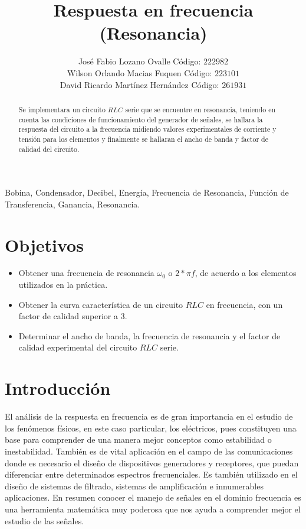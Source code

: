 \documentclass[twocolumn]{IEEEtran}
\begin{document}
\title{Respuesta en frecuencia (Resonancia)}
\author{José Fabio Lozano Ovalle Código: $222982$\\
	Wilson Orlando Macias Fuquen Código: $223101$\\
	David Ricardo Martínez Hernández Código: $261931$}
\maketitle
{}

\begin{abstract}
Se implementara un circuito $RLC$ serie que se encuentre en resonancia, teniendo en cuenta las condiciones de funcionamiento del generador de señales, se hallara la respuesta del circuito a la frecuencia midiendo valores experimentales de corriente y tensión para los elementos y finalmente se hallaran el ancho de banda y factor de calidad del circuito.
\end{abstract}

\begin{keywords}
Bobina, Condensador, Decibel, Energía, Frecuencia de Resonancia, Función de Transferencia, Ganancia, Resonancia.
\end{keywords}

\section{Objetivos}
\begin{itemize}
 \item Obtener una frecuencia de resonancia $\omega _0$ o $2*\pi f$, de acuerdo a los elementos utilizados en la práctica.
 \item Obtener la curva característica de un circuito $RLC$ en frecuencia, con un factor de calidad superior a $3$.
 \item Determinar el ancho de banda, la frecuencia de resonancia y el factor de calidad experimental del circuito $RLC$ serie.
\end{itemize}

\section{Introducción}
\noindent
El análisis de la respuesta en frecuencia es de gran importancia en el estudio de los fenómenos físicos, en este caso particular, los eléctricos, pues constituyen una base para comprender de una manera mejor conceptos como estabilidad o inestabilidad. También es de vital aplicación en el campo de las comunicaciones donde es necesario el diseño de dispositivos generadores y receptores, que puedan diferenciar entre determinados espectros frecuenciales. Es también utilizado en el diseño de sistemas de filtrado, sistemas de amplificación e innumerables aplicaciones. En resumen conocer el manejo de señales en el dominio frecuencia es una  herramienta matemática muy poderosa que nos ayuda a comprender mejor el estudio de las señales.
\end{document}
